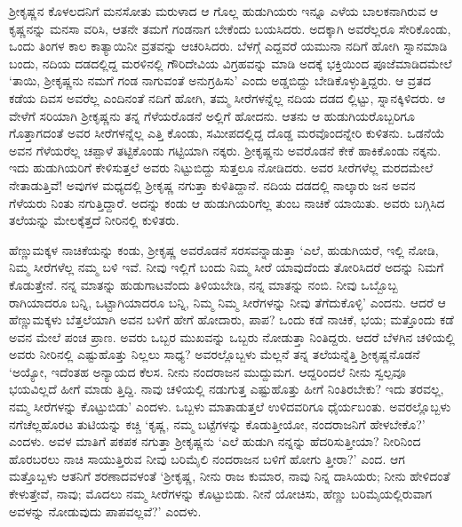 ಶ್ರೀಕೃಷ್ಣನ ಕೊಳಲದನಿಗೆ ಮನಸೋತು ಮರುಳಾದ ಆ ಗೊಲ್ಲ ಹುಡುಗಿಯರು ಇನ್ನೂ ಎಳೆಯ ಬಾಲಕನಾಗಿರುವ ಆ ಕೃಷ್ಣನನ್ನು ಮನಸಾ ವರಿಸಿ, ಆತನೇ ತಮಗೆ ಗಂಡನಾಗ ಬೇಕೆಂದು ಬಯಸಿದರು. ಅದಕ್ಕಾಗಿ ಅವರೆಲ್ಲರೂ ಸೇರಿಕೊಂಡು, ಒಂದು ತಿಂಗಳ ಕಾಲ ಕಾತ್ಯಾಯಿನೀ ವ್ರತವನ್ನು ಆಚರಿಸಿದರು. ಬೆಳಗ್ಗೆ ಎದ್ದವರೆ ಯಮುನಾ ನದಿಗೆ ಹೋಗಿ ಸ್ನಾನಮಾಡಿ ಬಂದು, ನದಿಯ ದಡದಲ್ಲಿದ್ದ ಮರಳಿನಲ್ಲಿ ಗೌರಿದೇವಿಯ ವಿಗ್ರಹವನ್ನು ಮಾಡಿ ಅದಕ್ಕೆ ಭಕ್ತಿಯಿಂದ ಪೂಜೆಮಾಡಿದಮೇಲೆ ‘ತಾಯಿ, ಶ್ರೀಕೃಷ್ಣನು ನಮಗೆ ಗಂಡ ನಾಗುವಂತೆ ಅನುಗ್ರಹಿಸು’ ಎಂದು ಅಡ್ಡಬಿದ್ದು ಬೇಡಿಕೊಳ್ಳುತ್ತಿದ್ದರು. ಆ ವ್ರತದ ಕಡೆಯ ದಿವಸ ಅವರೆಲ್ಲ ಎಂದಿನಂತೆ ನದಿಗೆ ಹೋಗಿ, ತಮ್ಮ ಸೀರೆಗಳನ್ನೆಲ್ಲ ನದಿಯ ದಡದ ಲ್ಲಿಟ್ಟು, ಸ್ನಾನಕ್ಕಿಳಿದರು. ಆ ವೇಳೆಗೆ ಸರಿಯಾಗಿ ಶ್ರೀಕೃಷ್ಣನು ತನ್ನ ಗೆಳೆಯರೊಡನೆ ಅಲ್ಲಿಗೆ ಹೋದನು. ಆತನು ಆ ಹುಡುಗಿಯರೊಬ್ಬರಿಗೂ ಗೊತ್ತಾಗದಂತೆ ಅವರ ಸೀರೆಗಳನ್ನೆಲ್ಲ ಎತ್ತಿ ಕೊಂಡು, ಸಮೀಪದಲ್ಲಿದ್ದ ದೊಡ್ಡ ಮರವೊಂದನ್ನೇರಿ ಕುಳಿತನು. ಒಡನೆಯೆ ಅವನ ಗೆಳೆಯರೆಲ್ಲ ಚಪ್ಪಾಳೆ ತಟ್ಟಿಕೊಂಡು ಗಟ್ಟಿಯಾಗಿ ನಕ್ಕರು. ಶ್ರೀಕೃಷ್ಣನು ಅವರೊಡನೆ ಕೇಕೆ ಹಾಕಿಕೊಂಡು ನಕ್ಕನು. ಇದು ಹುಡುಗಿಯರಿಗೆ ಕೇಳಿಸುತ್ತಲೆ ಅವರು ನಿಟ್ಟುಬಿದ್ದು ಸುತ್ತಲೂ ನೋಡಿದರು. ಅವರ ಸೀರೆಗಳೆಲ್ಲ ಮರದಮೇಲೆ ನೇತಾಡುತ್ತಿವೆ! ಅವುಗಳ ಮಧ್ಯದಲ್ಲಿ ಶ್ರೀಕೃಷ್ಣ ನಗುತ್ತಾ ಕುಳಿತಿದ್ದಾನೆ. ನದಿಯ ದಡದಲ್ಲಿ ನಾಲ್ಕಾರು ಜನ ಅವನ ಗೆಳೆಯರು ನಿಂತು ನಗುತ್ತಿದ್ದಾರೆ. ಅದನ್ನು ಕಂಡು ಆ ಹುಡುಗಿಯರಿಗೆಲ್ಲ ತುಂಬ ನಾಚಿಕೆ ಯಾಯಿತು. ಅವರು ಬಗ್ಗಿಸಿದ ತಲೆಯನ್ನು ಮೇಲಕ್ಕೆತ್ತದೆ ನೀರಿನಲ್ಲಿ ಕುಳಿತರು.

ಹೆಣ್ಣುಮಕ್ಕಳ ನಾಚಿಕೆಯನ್ನು ಕಂಡು, ಶ್ರೀಕೃಷ್ಣ ಅವರೊಡನೆ ಸರಸವನ್ನಾಡುತ್ತಾ ‘ಎಲೆ, ಹುಡುಗಿಯರೆ, ಇಲ್ಲಿ ನೋಡಿ, ನಿಮ್ಮ ಸೀರೆಗಳೆಲ್ಲ ನಮ್ಮ ಬಳಿ ಇವೆ. ನೀವು ಇಲ್ಲಿಗೆ ಬಂದು ನಿಮ್ಮ ಸೀರೆ ಯಾವುದೆಂದು ತೋರಿಸಿದರೆ ಅದನ್ನು ನಿಮಗೆ ಕೊಡುತ್ತೇನೆ. ನನ್ನ ಮಾತನ್ನು ಹುಡುಗಾಟವೆಂದು ತಿಳಿಯಬೇಡಿ, ನನ್ನ ಮಾತನ್ನು ನಂಬಿ. ನೀವು ಒಬ್ಬೊಬ್ಬ ರಾಗಿಯಾದರೂ ಬನ್ನಿ, ಒಟ್ಟಾಗಿಯಾದರೂ ಬನ್ನಿ, ನಿಮ್ಮ ನಿಮ್ಮ ಸೀರೆಗಳನ್ನು ನೀವು ತೆಗೆದುಕೊಳ್ಳಿ’ ಎಂದನು. ಆದರೆ ಆ ಹೆಣ್ಣುಮಕ್ಕಳು ಬೆತ್ತಲೆಯಾಗಿ ಅವನ ಬಳಿಗೆ ಹೇಗೆ ಹೋದಾರು, ಪಾಪ? ಒಂದು ಕಡೆ ನಾಚಿಕೆ, ಭಯ; ಮತ್ತೊಂದು ಕಡೆ ಅವನ ಮೇಲೆ ಪಂಚ ಪ್ರಾಣ. ಅವರು ಒಬ್ಬರ ಮುಖವನ್ನು ಒಬ್ಬರು ನೋಡುತ್ತಾ ನಿಂತಿದ್ದರು. ಆದರೆ ಬೆಳಗಿನ ಚಳಿಯಲ್ಲಿ ಅವರು ನೀರಿನಲ್ಲಿ ಎಷ್ಟುಹೊತ್ತು ನಿಲ್ಲಲು ಸಾಧ್ಯ? ಅವರಲ್ಲೊಬ್ಬಳು ಮೆಲ್ಲನೆ ತನ್ನ ತಲೆಯನ್ನೆತ್ತಿ ಶ್ರೀಕೃಷ್ಣನೊಡನೆ ‘ಅಯ್ಯೋ, ಇದೆಂತಹ ಅನ್ಯಾಯದ ಕೆಲಸ. ನೀನು ನಂದರಾಜನ ಮುದ್ದುಮಗ. ಆದ್ದರಿಂದಲೆ ನೀನು ಸ್ವಲ್ಪವೂ ಭಯವಿಲ್ಲದೆ ಹೀಗೆ ಮಾಡು ತ್ತಿದ್ದಿ. ನಾವು ಚಳಿಯಲ್ಲಿ ನಡುಗುತ್ತ ಎಷ್ಟುಹೊತ್ತು ಹೀಗೆ ನಿಂತಿರಬೇಕು? ಇದು ತರವಲ್ಲ, ನಮ್ಮ ಸೀರೆಗಳನ್ನು ಕೊಟ್ಟುಬಿಡು’ ಎಂದಳು. ಒಬ್ಬಳು ಮಾತಾಡುತ್ತಲೆ ಉಳಿದವರಿಗೂ ಧೈರ್ಯಬಂತು. ಅವರಲ್ಲೊಬ್ಬಳು ನಗೆಚೆಲ್ಲಹೊರಟ ತುಟಿಯನ್ನು ಕಚ್ಚಿ ‘ಕೃಷ್ಣ, ನಮ್ಮ ಬಟ್ಟೆಗಳನ್ನು ಕೊಡುತ್ತೀಯೋ, ನಂದರಾಜನಿಗೆ ಹೇಳಬೇಕೊ?’ ಎಂದಳು. ಅವಳ ಮಾತಿಗೆ ಪಕಪಕ ನಗುತ್ತಾ ಶ್ರೀಕೃಷ್ಣನು ‘ಎಲೆ ಹುಡುಗಿ ನನ್ನನ್ನು ಹೆದರಿಸುತ್ತೀಯಾ? ನೀರಿನಿಂದ ಹೊರಬರಲು ನಾಚಿ ಸಾಯುತ್ತಿರುವ ನೀವು ಬರಿಮೈಲಿ ನಂದರಾಜನ ಬಳಿಗೆ ಹೋಗು ತ್ತೀರಾ?’ ಎಂದ. ಆಗ ಮತ್ತೊಬ್ಬಳು ಆತನಿಗೆ ಶರಣಾದವಳಂತೆ ‘ಶ್ರೀಕೃಷ್ಣ, ನೀನು ರಾಜ ಕುಮಾರ, ನಾವು ನಿನ್ನ ದಾಸಿಯರು; ನೀನು ಹೇಳಿದಂತೆ ಕೇಳುತ್ತೇವೆ, ನಾವು; ಮೊದಲು ನಮ್ಮ ಸೀರೆಗಳನ್ನು ಕೊಟ್ಟುಬಿಡು. ನೀನೆ ಯೋಚಿಸು, ಹೆಣ್ಣು ಬರಿಮೈಯಲ್ಲಿರುವಾಗ ಅವಳನ್ನು ನೋಡುವುದು ಪಾಪವಲ್ಲವೆ?’ ಎಂದಳು.


